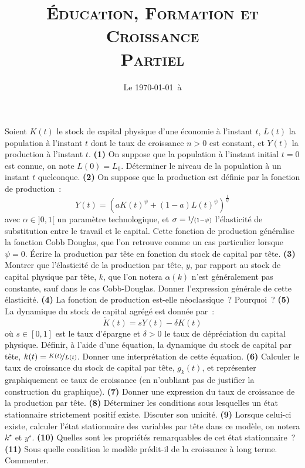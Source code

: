 \documentclass[11pt,a4paper,notitlepage,twocolumn]{article}
\begin{document}
\title{\textsc{Éducation, Formation et Croissance\\ \small{Partiel}}}
\date{Le \today\ à \thistime}

\maketitle
\thispagestyle{empty}

Soient $K(t)$ le stock de capital physique d'une économie à l'instant
$t$, $L(t)$ la population à l'instant $t$ dont le taux de croissance
$n>0$ est constant, et $Y(t)$ la production à l'instant
$t$. \textbf{(1)} On suppose que la population à l'instant initial
$t=0$ est connue, on note $L(0) = L_0$. Déterminer le niveau de la
population à un instant $t$ quelconque. \textbf{(2)} On suppose que la
production est définie par la fonction de production :
\[
Y(t) = \left(aK(t)^{\psi} + (1-a)L(t)^{\psi}\right)^{\frac{1}{\psi}}
\]
avec $\alpha\in]0,1[$ un paramètre technologique, et $\sigma=\nicefrac{1}{(1-\psi)}$ l'élasticité de substitution entre le travail et le capital. Cette fonction de production généralise la fonction Cobb Douglas, que l'on retrouve comme un cas particulier lorsque $\psi=0$. Écrire la production par tête en fonction du stock de capital par tête. \textbf{(3)} Montrer que l'élasticité de la production par tête, $y$, par rapport au stock de capital physique par tête, $k$, que l'on notera $\alpha(k)$ n'est généralement pas constante, sauf dans le cas Cobb-Douglas. Donner l'expression générale de cette élasticité. \textbf{(4)} La fonction de production est-elle néoclassique ? Pourquoi ? \textbf{(5)} La dynamique du stock de capital agrégé est donnée par :
\[
\dot K(t) = sY(t)-\delta K(t)
\]
où $s\in[0,1]$ est le taux d'épargne et $\delta>0$ le taux de dépréciation du capital physique. Définir, à l'aide d'une équation, la dynamique du stock de capital par tête, $k(t)=\nicefrac{K(t)}{L(t)}$. Donner une interprétation de cette équation. \textbf{(6)} Calculer le taux de croissance du stock de capital par tête, $g_k(t)$, et représenter graphiquement ce taux de croissance (en n'oubliant pas de justifier la construction du graphique). \textbf{(7)} Donner une expression du taux de croissance de la production par tête. \textbf{(8)} Déterminer les conditions sous lesquelles un état stationnaire strictement positif existe. Discuter son unicité. \textbf{(9)} Lorsque celui-ci existe, calculer l'état stationnaire des variables par tête dans ce modèle, on notera $k^{\star}$ et $y^{\star}$. \textbf{(10)} Quelles sont les propriétés remarquables de cet état stationnaire ? \textbf{(11)} Sous quelle condition le modèle prédit-il de la croissance à long terme. Commenter.
\end{document}
